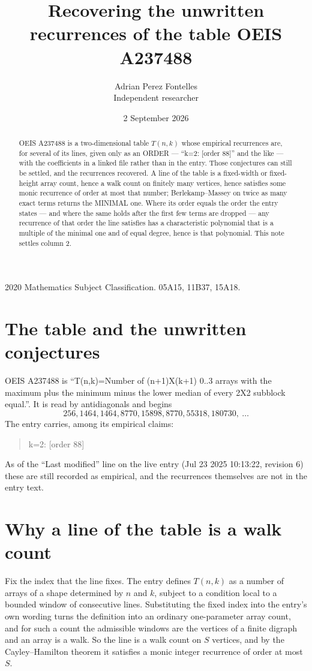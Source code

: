 \documentclass[11pt,a4paper]{article}
\title{Recovering the unwritten recurrences of the table OEIS A237488}
\author{Adrian Perez Fontelles\\ \small Independent researcher}
\date{2 September 2026}
\theoremstyle{plain}
\theoremstyle{definition}
\begin{document}
\maketitle

\begin{abstract}
OEIS A237488 is a two-dimensional table $T(n,k)$ whose empirical recurrences are, for several of
its lines, given only as an ORDER --- ``k=2: [order 88]'' and the like --- with the
coefficients in a linked file rather than in the entry. Those conjectures can still be settled,
and the recurrences recovered. A line of the table is a fixed-width or fixed-height array
count, hence a walk count on finitely many vertices, hence satisfies some monic recurrence of
order at most that number; Berlekamp--Massey on twice as many exact terms returns the MINIMAL
one. Where its order equals the order the entry states --- and where the same holds after the
first few terms are dropped --- any recurrence of that order the line satisfies has a
characteristic polynomial that is a multiple of the minimal one and of equal degree, hence is
that polynomial. This note settles column 2.
\end{abstract}

\noindent\small 2020 Mathematics Subject Classification. 05A15, 11B37, 15A18.\normalsize

\section{The table and the unwritten conjectures}

OEIS A237488 is ``T(n,k)=Number of (n+1)X(k+1) 0..3 arrays with the maximum plus the minimum minus the lower median of every 2X2 subblock equal.''. It is read by antidiagonals and begins
\[
256, 1464, 1464, 8770, 15898, 8770, 55318, 180730,\ \dots
\]
The entry carries, among its empirical claims:
\begin{quote}\small
k=2: [order 88]
\end{quote}
As of the ``Last modified'' line on the live entry (Jul 23 2025 10:13:22, revision 6) these are still
recorded as empirical, and the recurrences themselves are not in the entry text.

\section{Why a line of the table is a walk count}

Fix the index that the line fixes. The entry defines $T(n,k)$ as a number of arrays of a shape
determined by $n$ and $k$, subject to a condition local to a bounded window of consecutive
lines. Substituting the fixed index into the entry's own wording turns the definition into an
ordinary one-parameter array count, and for such a count the admissible windows are the
vertices of a finite digraph and an array is a walk. So the line is a walk count on $S$
vertices, and by the Cayley--Hamilton theorem it satisfies a monic integer recurrence of order
at most $S$.
\end{document}
